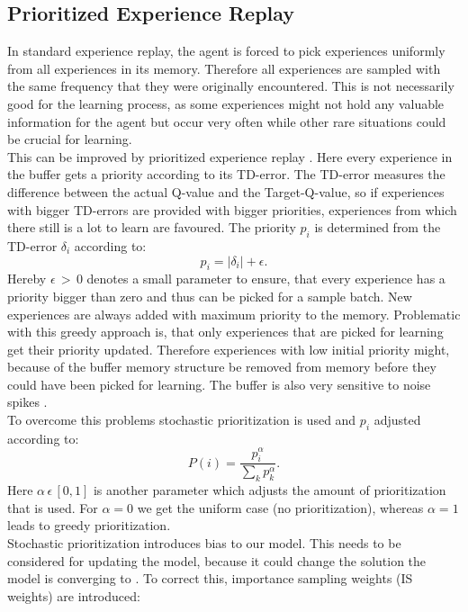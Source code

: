 \subsection{Prioritized Experience Replay}
In standard experience replay, the agent is forced to pick experiences uniformly from all experiences in its memory. Therefore all experiences are sampled with the same frequency that they were originally encountered.
This is not necessarily good for the learning process, as some experiences might not hold any valuable information for the agent but occur very often while other rare situations could be crucial for learning. \\
This can be improved by prioritized experience replay \cite{DBLP:journals/corr/SchaulQAS15}. Here every experience in the buffer gets a priority according to its TD-error.
The TD-error measures the difference between the actual Q-value and the Target-Q-value, so if experiences with bigger TD-errors are provided with bigger priorities, experiences from which there still is a lot to learn are favoured.
The priority $p_i$ is determined from the TD-error $\delta_i$ according to:
\begin{equation}
p_{i}=\left|\delta_{i}\right|+\epsilon.
\end{equation}
Hereby $\epsilon\,>\,0$ denotes a small parameter to ensure, that every experience has a priority bigger than zero and thus can be picked for a sample batch.
New experiences are always added with maximum priority to the memory.
Problematic with this greedy approach is, that only experiences that are picked for learning get their priority updated. Therefore experiences with low initial priority might, because of the buffer memory structure be removed from memory before they could have been picked for learning. The buffer is also very sensitive to noise spikes \cite{DBLP:journals/corr/SchaulQAS15}. \\
To overcome this problems stochastic prioritization is used and $p_i$ adjusted according to:
\begin{equation}
P(i)=\frac{p_{i}^{\alpha}}{\sum_{k} p_{k}^{\alpha}}.
\end{equation}
Here $\alpha\,\epsilon\,[0,1]$ is another parameter which adjusts the amount of prioritization that is used. For $\alpha=0$ we get the uniform case (no prioritization), whereas $\alpha=1$ leads to greedy prioritization. \\
Stochastic prioritization introduces bias to our model. This needs to be considered for updating the model, because it could change the solution the model is converging to \cite{DBLP:journals/corr/SchaulQAS15}. To correct this, importance sampling weights (IS weights) are introduced: 
